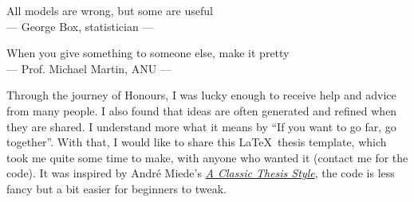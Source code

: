 \thispagestyle{empty}

\vspace*{3cm}

\begin{center}
All models are wrong, but some are useful \\ \medskip
--- George Box, statistician ---   

When you give something to someone else, make it pretty \\ \medskip
--- Prof. Michael Martin, ANU ---   

\end{center}

\vspace{2cm}

Through the journey of Honours, I was lucky enough to receive help and advice from many people. I also found that ideas are often generated and refined when they are shared. I understand more what it means by ``If you want to go far, go together''. With that, I would like to share this \LaTeX\ thesis template, which took me quite some time to make, with anyone who wanted it (contact me for the code). It was inspired by André Miede's \href{https://bitbucket.org/amiede/classicthesis/wiki/Home}{\textit{A Classic Thesis Style}}, the code is less fancy but a bit easier for beginners to tweak.
